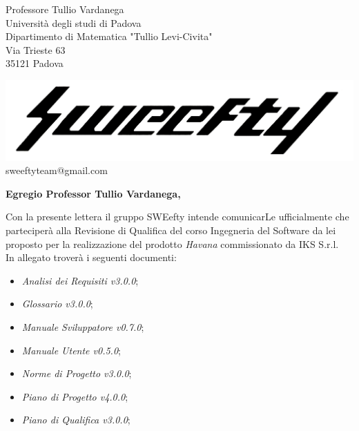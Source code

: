 \documentclass[12pt]{letter} %
\date{16/04/2018} %
\begin{document}



\begin{letter}{Professore Tullio Vardanega \\ Università degli studi di Padova \\ Dipartimento di Matematica "Tullio Levi-Civita" \\ Via Trieste 63 \\ 35121 Padova} %

\begin{center}
\includegraphics[width=\linewidth]{../../CommonImages/logo.jpg}
sweeftyteam@gmail.com
\end{center}

\opening{\textbf{Egregio Professor Tullio Vardanega,}}
\begin{addmargin}[2em]{2em}
  \hspace{1cm} Con la presente lettera il gruppo SWEefty intende comunicarLe ufficialmente che parteciperà alla Revisione di Qualifica del corso Ingegneria del Software da lei proposto per la realizzazione del prodotto \emph{Havana} commissionato da IKS S.r.l.\\
  In allegato troverà i seguenti documenti:
      \begin{itemize}
      \item \emph{Analisi dei Requisiti v3.0.0};
      \item \emph{Glossario v3.0.0};
      \item \emph{Manuale Sviluppatore v0.7.0};
      \item \emph{Manuale Utente v0.5.0};
       \item \emph{Norme di Progetto v3.0.0};
       \item \emph{Piano di Progetto v4.0.0};
      \item \emph{Piano di Qualifica v3.0.0};


\end{itemize}
\end{addmargin}
\end{letter}
\end{document}
